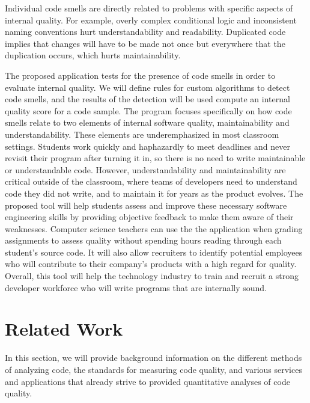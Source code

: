 \documentclass{sig-alternate}
\begin{document}
Individual code smells are directly related to problems with specific aspects of internal quality. For example, overly complex conditional logic and inconsistent naming conventions hurt understandability and readability. Duplicated code implies that changes will have to be made not once but everywhere that the duplication occurs, which hurts maintainability. 

The proposed application tests for the presence of code smells in order to evaluate internal quality. We will define rules for custom algorithms to detect code smells, and the results of the detection will be used compute an internal quality score for a code sample. The program focuses specifically on how code smells relate to two elements of internal software quality, maintainability and understandability. These elements are underemphasized in most classroom settings. Students work quickly and haphazardly to meet deadlines and never revisit their program after turning it in, so there is no need to write maintainable or understandable code.  However, understandability and maintainability are critical outside of the classroom, where teams of developers need to understand code they did not write, and to maintain it for years as the product evolves. The proposed tool will help students assess and improve these necessary software engineering skills by providing objective feedback to make them aware of their weaknesses. Computer science teachers can use the the application when grading assignments to assess quality without spending hours reading through each student's source code. It will also allow recruiters to identify potential employees who will contribute to their company's products with a high regard for quality. Overall, this tool will help the technology industry to train and recruit a strong developer workforce who will write programs that are internally sound. 

\section{Related Work}
\label{sec:related_work}
In this section, we will provide background information on the different methods of analyzing code, the standards for measuring code quality, and various services and applications that already strive to provided quantitative analyses of code quality.
\end{document}

